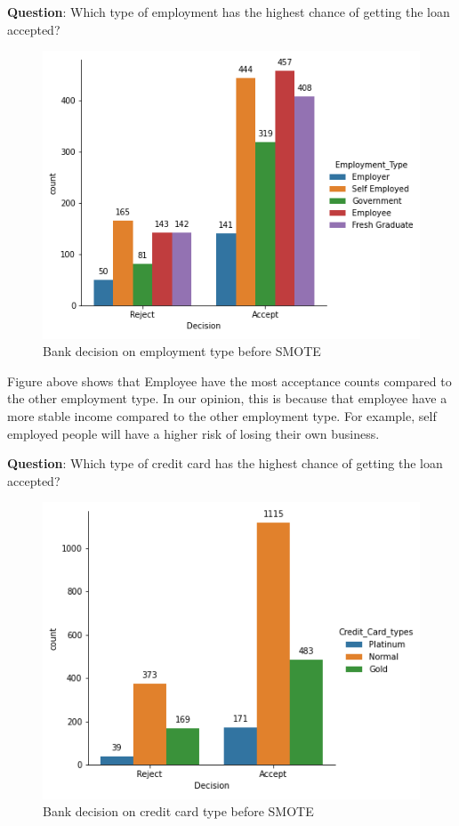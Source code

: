 \documentclass[11pt]{article}
\begin{document}
\noindent \textbf{Question}: Which type of employment has the highest chance of getting the loan accepted?
\begin{figure}[h]
\centerline{\includegraphics[scale=0.8]{bSMOTE_dcs_employment.png} }
\label{fig:bSmoteDCSemp}
\caption{Bank decision on employment type before SMOTE}
\end{figure}

Figure above shows that Employee have the most acceptance counts compared to the other employment type. In our opinion, this is because that employee have a more stable income compared to the other employment type. For example, self employed people will have a higher risk of losing their own business.
\clearpage

\noindent \textbf{Question}: Which type of credit card has the highest chance of getting the loan accepted?
\begin{figure}[h]
\centerline{\includegraphics[scale=0.8]{bSMOTE_dcs_ccard_type.png} }
\label{fig:bSmoteDSCcc}
\caption{Bank decision on credit card type before SMOTE}
\end{figure}
\end{document}
